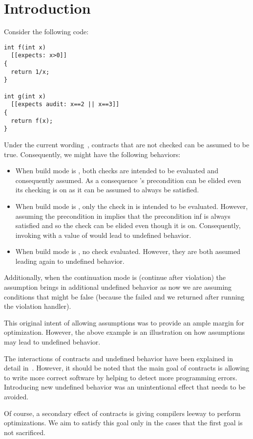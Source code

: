 \section{Introduction}

Consider the following code:

\begin{lstlisting}
int f(int x)
  [[expects: x>0]]
{
  return 1/x;
}

int g(int x)
  [[expects audit: x==2 || x==3]]
{
  return f(x);
}
\end{lstlisting}

Under the current wording~\cite{p0542r5}, contracts that are not checked can be assumed to be
true. Consequently, we might have the following behaviors:

\begin{itemize}
  \item When build mode is , both checks are intended to be evaluated and
consequently assumed. As a consequence 's precondition 
can be elided even its checking is on
as it can be assumed to always be satisfied.
  \item When build mode is , only the check in 
is intended to be evaluated. However, assuming the precondition in  implies that
the precondition inf  is always satisfied and so the check can be elided 
even though it is on. 
Consequently, invoking
 with a value of  would lead to undefined behavior.
  \item When build mode is , no check evaluated. However, they are
both assumed leading again to undefined behavior.
\end{itemize}

Additionally, when the continuation mode is  (continue after violation)
the assumption brings in additional undefined behavior as now we are assuming conditions
that might be false (because the failed and we returned after running the violation
handler).

This original intent of allowing assumptions was to provide an ample margin for
optimization. However, the above example is an illustration on how assumptions
may lead to undefined behavior.

The interactions of contracts and undefined behavior have been explained in
detail in~\cite{p1321r0}. However, it should be noted that the main goal of
contracts is allowing to write more correct software by helping to detect more
programming errors. Introducing new undefined behavior was an unintentional
effect that needs to be avoided.

Of course, a secondary effect of contracts is giving compilers leeway to perform
optimizations. We aim to satisfy this goal only in the cases that the first goal
is not sacrificed.
